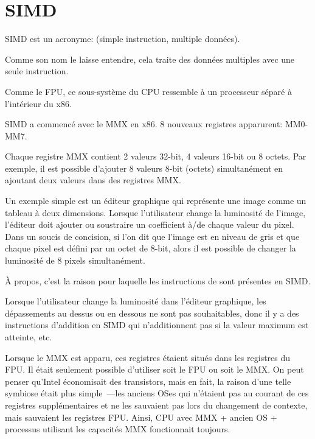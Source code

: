 \section{SIMD}

\label{SIMD_x86}
\ac{SIMD} est un acronyme:  (simple instruction,
multiple données).

Comme son nom le laisse entendre, cela traite des données multiples avec une seule
instruction.

Comme le \ac{FPU}, ce sous-système du \ac{CPU} ressemble à un processeur séparé à
l'intérieur du x86.


SIMD a commencé avec le MMX en x86. 8 nouveaux registres apparurent: MM0-MM7.

Chaque registre MMX contient 2 valeurs 32-bit, 4 valeurs 16-bit ou 8 octets.
Par exemple, il est possible d'ajouter 8 valeurs 8-bit (octets) simultanément en
ajoutant deux valeurs dans des registres MMX.

Un exemple simple est un éditeur graphique qui représente une image comme un tableau
à deux dimensions.
Lorsque l'utilisateur change la luminosité de l'image, l'éditeur doit ajouter ou
soustraire un coefficient à/de chaque valeur du pixel.
Dans un soucis de concision, si l'on dit que l'image est en niveau de gris et que
chaque pixel est défini par un octet de 8-bit, alors il est possible de changer la
luminosité de 8 pixels simultanément.

À propos, c'est la raison pour laquelle les instructions de  sont
présentes en SIMD.

Lorsque l'utilisateur change la luminosité dans l'éditeur graphique, les dépassements
au dessus ou en dessous ne sont pas souhaitables, donc il y a des instructions d'addition
en SIMD qui n'additionnent pas si la valeur maximum est atteinte, etc.

Lorsque le MMX est apparu, ces registres étaient situés dans les registres du FPU.
Il était seulement possible d'utiliser soit le FPU ou soit le MMX. On peut penser
qu'Intel économisait des transistors, mais en fait, la raison d'une telle symbiose
était plus simple~---les anciens \ac{OS}es qui n'étaient pas au courant de ces registres
supplémentaires et ne les sauvaient pas lors du changement de contexte, mais sauvaient
les registres FPU.
Ainsi, CPU avec MMX + ancien \ac{OS} + processus utilisant les capacités MMX fonctionnait
toujours.

